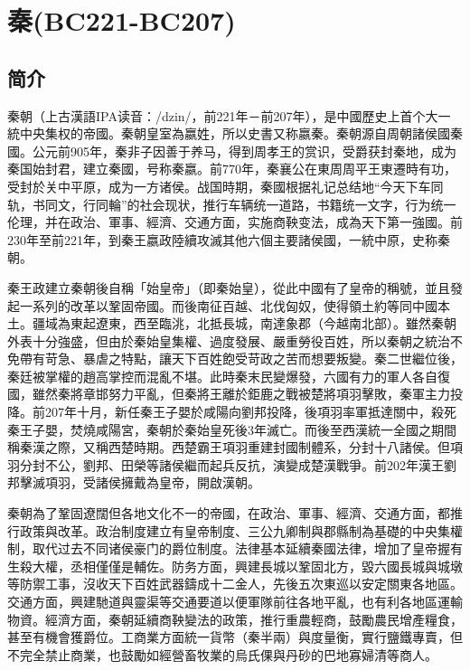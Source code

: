 
\chapter{秦\tiny(BC221-BC207)}

\section{简介}

秦朝（上古漢語IPA读音：/dzin/，前221年－前207年），是中國歷史上首个大一統中央集权的帝國。秦朝皇室為嬴姓，所以史書又称嬴秦。秦朝源自周朝諸侯國秦國。公元前905年，秦非子因善于养马，得到周孝王的赏识，受爵获封秦地，成为秦国始封君，建立秦國，号称秦嬴。前770年，秦襄公在東周周平王東遷時有功，受封於关中平原，成为一方诸侯。战国時期，秦國根据礼记总结地“今天下车同轨，书同文，行同輪”的社会现状，推行车辆统一道路，书籍统一文字，行为统一伦理，并在政治、軍事、經濟、交通方面，实施商鞅变法，成為天下第一強國。前230年至前221年，到秦王嬴政陸續攻滅其他六個主要諸侯國，一統中原，史称秦朝。

秦王政建立秦朝後自稱「始皇帝」（即秦始皇），從此中國有了皇帝的稱號，並且發起一系列的改革以鞏固帝國。而後南征百越、北伐匈奴，使得領土約等同中國本土。疆域為東起遼東，西至臨洮，北抵長城，南達象郡（今越南北部）。雖然秦朝外表十分強盛，但由於秦始皇集權、過度發展、嚴重勞役百姓，所以秦朝之統治不免帶有苛急、暴虐之特點，讓天下百姓飽受苛政之苦而想要叛變。秦二世繼位後，秦廷被掌權的趙高掌控而混亂不堪。此時秦末民變爆發，六國有力的軍人各自復國，雖然秦將章邯努力平亂，但秦將王離於鉅鹿之戰被楚將項羽擊敗，秦軍主力投降。前207年十月，新任秦王子嬰於咸陽向劉邦投降，後項羽率軍抵達關中，殺死秦王子嬰，焚燒咸陽宮，秦朝於秦始皇死後3年滅亡。而後至西漢統一全國之期間稱秦漢之際，又稱西楚時期。西楚霸王項羽重建封國制體系，分封十八諸侯。但項羽分封不公，劉邦、田榮等諸侯繼而起兵反抗，演變成楚漢戰爭。前202年漢王劉邦擊滅項羽，受諸侯擁戴為皇帝，開啟漢朝。

秦朝為了鞏固遼闊但各地文化不一的帝國，在政治、軍事、經濟、交通方面，都推行政策與改革。政治制度建立有皇帝制度、三公九卿制與郡縣制為基礎的中央集權制，取代过去不同诸侯豪门的爵位制度。法律基本延續秦國法律，增加了皇帝握有生殺大權，丞相僅僅是輔佐。防务方面，興建長城以鞏固北方，毀六國長城與城墩等防禦工事，沒收天下百姓武器鑄成十二金人，先後五次東巡以安定關東各地區。交通方面，興建馳道與靈渠等交通要道以便軍隊前往各地平亂，也有利各地區運輸物資。經濟方面，秦朝延續商鞅變法的政策，推行重農輕商，鼓勵農民增產糧食，甚至有機會獲爵位。工商業方面統一貨幣（秦半兩）與度量衡，實行鹽鐵專賣，但不完全禁止商業，也鼓勵如經營畜牧業的烏氏倮與丹砂的巴地寡婦清等商人。

